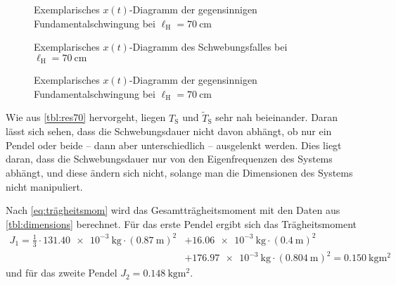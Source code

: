 \documentclass[
12pt,
a4paper,
bibliography=totocnumbered, %
BCOR=1cm, %
oneside, %
]{scrartcl}
\newcommand{\lh}{\ell_{\mathrm{H}}}
\begin{document}
\begin{figure}[H]
	\caption{Exemplarisches \(x(t)\)-Diagramm der gegensinnigen Fundamentalschwingung bei \(\lh = \qty{70}{\centi\meter}\)}
	\label{fig:geg70}
\end{figure}

\begin{figure}[H]
	\caption{Exemplarisches \(x(t)\)-Diagramm des Schwebungsfalles bei \(\lh = \qty{70}{\centi\meter}\)}
	\label{fig:schweb}
\end{figure}

\begin{figure}[H]
	\caption{Exemplarisches \(x(t)\)-Diagramm der gegensinnigen Fundamentalschwingung bei \(\lh = \qty{70}{\centi\meter}\)}
	\label{fig:ungl70}
\end{figure}

Wie aus \autoref{tbl:res70} hervorgeht, liegen \(T_{\text{S}}\) und \(\tilde{T}_{\text{S}}\) sehr nah beieinander. Daran lässt sich sehen, dass die Schwebungsdauer nicht davon abhängt, ob nur ein Pendel oder beide -- dann aber unterschiedlich -- ausgelenkt werden. Dies liegt daran, dass die Schwebungsdauer nur von den Eigenfrequenzen des Systems abhängt, und diese ändern sich nicht, solange man die Dimensionen des Systems nicht manipuliert.

%
%
%

Nach \autoref{eq:trägheitsmom} wird das Gesamtträgheitsmoment mit den Daten aus \autoref{tbl:dimensions} berechnet. Für das erste Pendel ergibt sich das Trägheitsmoment
\begin{equation}
	\begin{split}
		J_1 = \frac{1}{3} \cdot \qty{131,40e-3}{\kilogram} \cdot (\qty{0,87}{\meter})^2 &+ \qty{16,06e-3}{\kilogram} \cdot (\qty{0,4}{\meter})^2
		\\&+ \qty{176,97e-3}{\kilogram} \cdot (\qty{0,804}{\meter})^2 = \qty{0,150}{\kilogram\meter\squared}
	\end{split}
\end{equation}
und für das zweite Pendel \(J_2 = \qty{0,148}{\kilogram\meter\squared}\).
\end{document}
